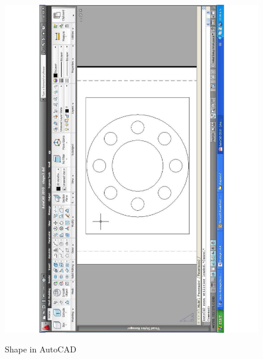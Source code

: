 \begin{figure}
\begin{center}
	\includegraphics[scale=0.5, angle=270]{figure-chapterIV/fig4-31}\\
	\caption{Shape in AutoCAD}
	\label{figure4-31}
\end{center}
\end{figure}





